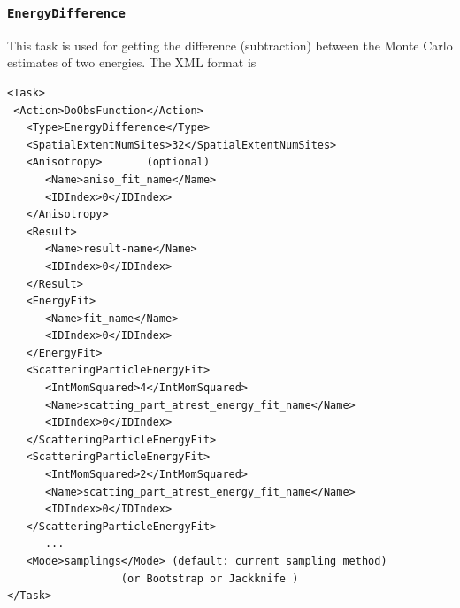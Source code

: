 \documentclass[12pt]{article}
\newcommand{\vb}{\texttt}
\begin{document}
\subsubsection{\vb{EnergyDifference}}
This task is used for getting the difference (subtraction) between the Monte
Carlo estimates of two energies.  The XML format is
\begin{verbatim}
<Task>                                                                   
 <Action>DoObsFunction</Action>                                          
   <Type>EnergyDifference</Type>                                         
   <SpatialExtentNumSites>32</SpatialExtentNumSites>                     
   <Anisotropy>       (optional)                                         
      <Name>aniso_fit_name</Name>                                        
      <IDIndex>0</IDIndex>                                               
   </Anisotropy>                                                         
   <Result>                                                              
      <Name>result-name</Name>                                           
      <IDIndex>0</IDIndex>                                               
   </Result>                                                             
   <EnergyFit>                                                           
      <Name>fit_name</Name>                                              
      <IDIndex>0</IDIndex>                                               
   </EnergyFit>                                                          
   <ScatteringParticleEnergyFit>                                         
      <IntMomSquared>4</IntMomSquared>                                   
      <Name>scatting_part_atrest_energy_fit_name</Name>                  
      <IDIndex>0</IDIndex>                                               
   </ScatteringParticleEnergyFit>                                        
   <ScatteringParticleEnergyFit>                                         
      <IntMomSquared>2</IntMomSquared>                                   
      <Name>scatting_part_atrest_energy_fit_name</Name>                  
      <IDIndex>0</IDIndex>                                               
   </ScatteringParticleEnergyFit>                                        
      ...                                                                
   <Mode>samplings</Mode> (default: current sampling method)             
                  (or Bootstrap or Jackknife )                           
</Task>                                                                  
 \end{verbatim}
 
\end{document}
